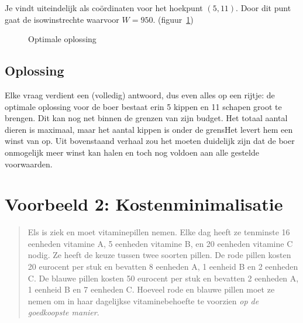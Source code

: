 Je vindt uiteindelijk als co\"{o}rdinaten voor het hoekpunt $(5,
11)$. Door dit punt gaat de isowinstrechte waarvoor $W= 950$.
(figuur~\ref{fig:maxwinstrechte})
\begin{figure}[htbp]
    \centering
{}
     \caption{Optimale oplossing}
    \label{fig:maxwinstrechte}
\end{figure}




\subsection{Oplossing}
Elke vraag verdient een (volledig) antwoord, dus even alles op
een rijtje: de optimale oplossing voor de boer bestaat erin 5 kippen en 11
schapen groot te brengen. Dit kan nog net binnen de grenzen van
zijn budget. Het totaal aantal dieren is maximaal, maar het aantal kippen is onder de grensHet levert hem een winst van  op. Uit
bovenstaand verhaal zou het moeten duidelijk zijn dat de boer
onmogelijk meer winst kan halen en toch nog voldoen aan alle
gestelde voorwaarden.





\newpage
\section{Voorbeeld 2: Kostenminimalisatie}\label{sec.minprob}

\begin{quote}
    Els is ziek en moet vitaminepillen nemen. Elke dag heeft ze tenminste
    16 eenheden vitamine A, 5 eenheden vitamine B, en 20 eenheden
    vitamine C nodig. Ze heeft de keuze tussen twee soorten pillen.
    De rode pillen kosten 20 eurocent per stuk en bevatten 8 eenheden
    A, 1 eenheid B en 2 eenheden C. De blauwe pillen kosten 50 eurocent
    per stuk en bevatten 2 eenheden A, 1 eenheid B en 7 eenheden
    C. Hoeveel rode en blauwe pillen moet ze nemen om in haar dagelijkse
    vitaminebehoefte te voorzien \emph{op de goedkoopste manier}.
\end{quote}



